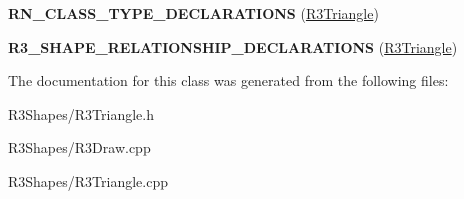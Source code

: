 \begin{DoxyCompactItemize}
\item 
{\bfseries R\+N\+\_\+\+C\+L\+A\+S\+S\+\_\+\+T\+Y\+P\+E\+\_\+\+D\+E\+C\+L\+A\+R\+A\+T\+I\+O\+NS} (\hyperlink{class_r3_triangle}{R3\+Triangle})\hypertarget{class_r3_triangle_a6ab4e614ff35a2ec6c3900d3f36eaa15}{}\label{class_r3_triangle_a6ab4e614ff35a2ec6c3900d3f36eaa15}

\item 
{\bfseries R3\+\_\+\+S\+H\+A\+P\+E\+\_\+\+R\+E\+L\+A\+T\+I\+O\+N\+S\+H\+I\+P\+\_\+\+D\+E\+C\+L\+A\+R\+A\+T\+I\+O\+NS} (\hyperlink{class_r3_triangle}{R3\+Triangle})\hypertarget{class_r3_triangle_a144aab96542103c61ff053832ae4cbaa}{}\label{class_r3_triangle_a144aab96542103c61ff053832ae4cbaa}

\end{DoxyCompactItemize}


The documentation for this class was generated from the following files\+:\begin{DoxyCompactItemize}
\item 
R3\+Shapes/R3\+Triangle.\+h\item 
R3\+Shapes/R3\+Draw.\+cpp\item 
R3\+Shapes/R3\+Triangle.\+cpp\end{DoxyCompactItemize}
